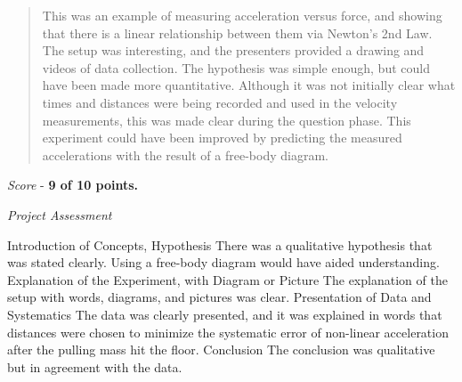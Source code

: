 \documentclass[10pt]{article}
\begin{document}
\maketitle

\begin{abstract}
This was an example of measuring acceleration versus force, and showing that there is a linear relationship between them via Newton's 2nd Law.  The setup was interesting, and the presenters provided a drawing and videos of data collection.  The hypothesis was simple enough, but could have been made more quantitative.  Although it was not initially clear what times and distances were being recorded and used in the velocity measurements, this was made clear during the 	question phase.  This experiment could have been improved by predicting the measured accelerations with the result of a free-body diagram.
\end{abstract}

\textit{Score} - \textbf{9 of 10 points.}

\textit{Project Assessment}
\begin{outline}[enumerate]
\1 Introduction of Concepts, Hypothesis
\2 There was a qualitative hypothesis that was stated clearly.  Using a free-body diagram would have aided understanding.
\1 Explanation of the Experiment, with Diagram or Picture
\2 The explanation of the setup with words, diagrams, and pictures was clear.
\1 Presentation of Data and Systematics
\2 The data was clearly presented, and it was explained in words that distances were chosen to minimize the systematic error of non-linear acceleration after the pulling mass hit the floor.
\1 Conclusion
\2 The conclusion was qualitative but in agreement with the data.
\end{outline}
\end{document}
